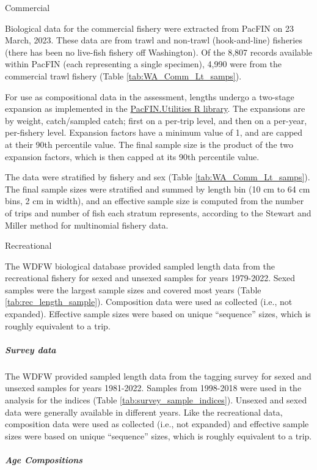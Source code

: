 \documentclass[11pt,
  letterpaper,
]{article}
\begin{document}
Commercial

Biological data for the commercial fishery were extracted from PacFIN on 23 March, 2023. These data are from trawl and non-trawl (hook-and-line) fisheries (there has been no live-fish fishery off Washington). Of the 8,807 records available within PacFIN (each representing a single specimen), 4,990 were from the commercial trawl fishery (Table \ref{tab:WA_Comm_Lt_samps}).

For use as compositional data in the assessment, lengths undergo a two-stage expansion as implemented in the \href{https://github.com/pfmc-assessments/PacFIN.Utilities}{PacFIN.Utilities R library}. The expansions are by weight, catch/sampled catch; first on a per-trip level, and then on a per-year, per-fishery level. Expansion factors have a minimum value of 1, and are capped at their 90th percentile value. The final sample size is the product of the two expansion factors, which is then capped at its 90th percentile value.

The data were stratified by fishery and sex (Table \ref{tab:WA_Comm_Lt_samps}). The final sample sizes were stratified and summed by length bin (10 cm to 64 cm bins, 2 cm in width), and an effective sample size is computed from the number of trips and number of fish each stratum represents, according to the Stewart and Miller method for multinomial fishery data.

Recreational

The WDFW biological database provided sampled length data from the recreational fishery for sexed and unsexed samples for years 1979-2022. Sexed samples were the largest sample sizes and covered most years (Table \ref{tab:rec_length_sample}). Composition data were used as collected (i.e., not expanded). Effective sample sizes were based on unique ``sequence'' sizes, which is roughly equivalent to a trip.

\hypertarget{survey-data}{%
\subparagraph{Survey data}\label{survey-data}}

The WDFW provided sampled length data from the tagging survey for sexed and unsexed samples for years 1981-2022. Samples from 1998-2018 were used in the analysis for the indices (Table \ref{tab:survey_sample_indices}). Unsexed and sexed data were generally available in different years. Like the recreational data, composition data were used as collected (i.e., not expanded) and effective sample sizes were based on unique ``sequence'' sizes, which is roughly equivalent to a trip.

\hypertarget{age-compositions}{%
\subparagraph{Age Compositions}\label{age-compositions}}
\end{document}
